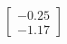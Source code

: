 \documentclass[preview]{standalone}
\begin{document}
\begin{align*}
\begin{bmatrix} -0.25 \\ -1.17 \end{bmatrix}
\end{align*}
\end{document}

